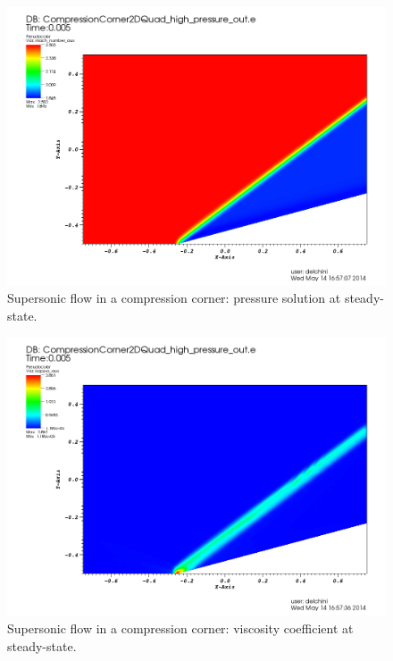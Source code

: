          \begin{figure}[H]%
                \centering
                \includegraphics[width=\textwidth]{figures/CCDensityTimeStt.png}
                \caption{Supersonic flow in a compression corner: pressure solution at steady-state.}
                \label{fig:2d_cpc_rho_stt}
        \end{figure}%
        \begin{figure}[H]%
                \centering
                \includegraphics[width=\textwidth]{figures/CCViscosityTimeStt.png}
                \caption{Supersonic flow in a compression corner: viscosity coefficient at steady-state.}
                \label{fig:2d_cpc_visc_stt}
        \end{figure}
